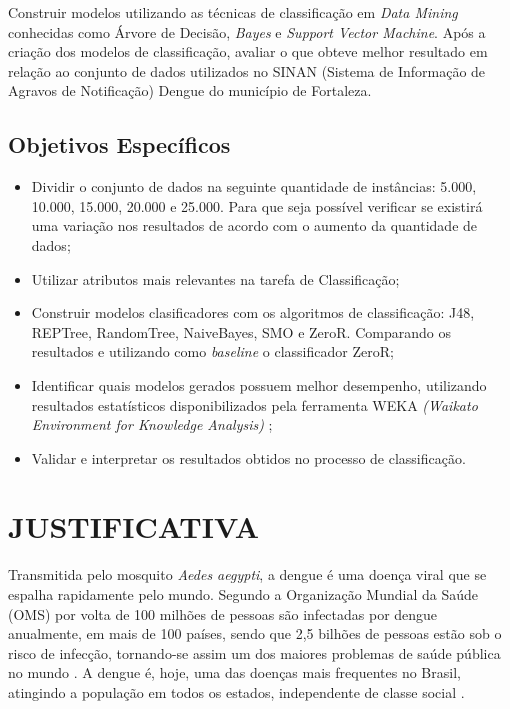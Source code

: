 \documentclass[
	12pt,				%
	openright,			%
	oneside,	
	a4paper,				%
	english,				%
	brazil				%
]{abntex2/abntex2} %
\begin{document}
		Construir modelos utilizando as técnicas de classificação em \textit{Data Mining} conhecidas como Árvore de Decisão, \textit{Bayes} e \textit{Support Vector Machine}. Após a criação dos modelos de classificação, avaliar o que obteve melhor resultado em relação ao conjunto de dados utilizados no SINAN (Sistema de Informação de Agravos de Notificação) Dengue do município de Fortaleza. 
		
		\subsection{Objetivos Específicos}
		
		\begin{itemize}
			\item Dividir o conjunto de dados na seguinte quantidade de instâncias: 5.000, 10.000, 15.000, 20.000 e 25.000. Para que seja possível verificar se existirá uma variação nos resultados de acordo com o aumento da quantidade de dados;
			
			\item Utilizar atributos mais relevantes na tarefa de Classificação;
			
			\item Construir modelos clasificadores com os algoritmos de classificação: J48, REPTree, RandomTree, NaiveBayes, SMO e ZeroR. Comparando os resultados e utilizando como \textit{baseline} o classificador ZeroR;

			\item Identificar quais modelos gerados possuem melhor desempenho, utilizando resultados estatísticos disponibilizados pela ferramenta WEKA \textit{(Waikato Environment for Knowledge Analysis)} ;
			
			\item Validar e interpretar os resultados obtidos no processo de classificação.
		\end{itemize}
		
	\section{JUSTIFICATIVA}
	

	Transmitida pelo mosquito \textit{Aedes aegypti}, a dengue é uma doença viral que se espalha rapidamente pelo mundo. Segundo a Organização Mundial da Saúde (OMS) por volta de 100 milhões de pessoas são infectadas por dengue anualmente, em mais de 100 países, sendo que 2,5 bilhões de pessoas estão sob o risco de infecção, tornando-se assim um dos maiores problemas de saúde pública no mundo \cite{bhatt:2013}. A dengue é, hoje, uma das doenças mais frequentes no Brasil, atingindo a população em todos os estados, independente de classe social \cite{saude:2008}.
	
\end{document}
